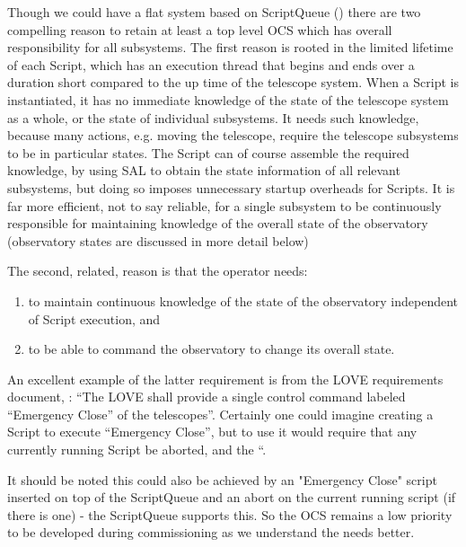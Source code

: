 Though we could have a flat system based on ScriptQueue ()
there are two compelling reason to retain at least a top level OCS which has
overall responsibility for all subsystems. The first reason is rooted in the limited lifetime of each
Script, which has an execution thread that begins and ends over a duration short compared to
the up time of the telescope system. When a Script is instantiated, it has no immediate
knowledge of the state of the telescope system as a whole, or the state of individual
subsystems. It needs such knowledge, because many actions, e.g. moving the telescope,
require the telescope subsystems to be in particular states. The Script can of course assemble
the required knowledge, by using SAL to obtain the state information of all relevant subsystems,
but doing so imposes unnecessary startup overheads for Scripts. It is far more efficient, not to
say reliable, for a single subsystem to be continuously responsible for maintaining knowledge of
the overall state of the observatory (observatory states are discussed in more detail below)

The second, related, reason is that the operator needs:
\begin{enumerate}
\item to maintain continuous knowledge of
the state of the observatory independent of Script execution, and
\item  to be able to command the
observatory to change its overall state.
\end{enumerate}
An excellent example of the latter requirement is from
the LOVE requirements document, : “The LOVE shall provide a single control
command labeled “Emergency Close” of the telescopes”. Certainly one could imagine creating
a Script to execute “Emergency Close”, but to use it would require that any currently running
Script be aborted, and the “.

It should be noted this could also be achieved by an "Emergency Close" script inserted on top of the ScriptQueue and an abort on the current running script (if there is one) - the ScriptQueue supports this.  So the OCS remains a low priority to be developed during commissioning as we understand the needs better.
